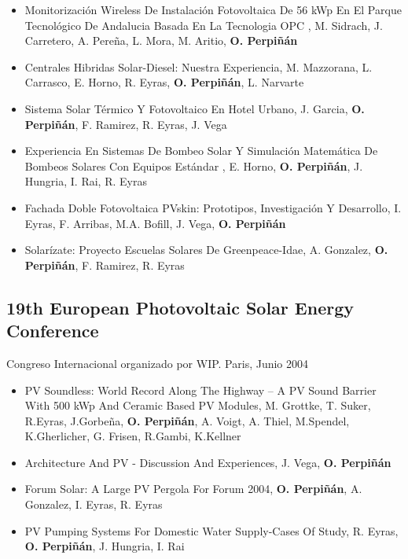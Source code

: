 \documentclass[article, a4paper]{memoir}
\begin{document}
\begin{itemize}
\item Monitorización Wireless De Instalación Fotovoltaica De 56 kWp En El Parque Tecnológico De Andalucia Basada En La Tecnologia OPC , M. Sidrach, J. Carretero, A. Pereña, L. Mora, M. Aritio, \textbf{O. Perpiñán}

\item Centrales Hibridas Solar-Diesel: Nuestra Experiencia, M. Mazzorana, L. Carrasco, E. Horno, R. Eyras, \textbf{O. Perpiñán}, L.  Narvarte

\item Sistema Solar Térmico Y Fotovoltaico En Hotel Urbano, J. Garcia, \textbf{O. Perpiñán}, F. Ramirez, R. Eyras, J. Vega

\item Experiencia En Sistemas De Bombeo Solar Y Simulación Matemática De Bombeos Solares Con Equipos Estándar , E. Horno, \textbf{O. Perpiñán}, J. Hungria, I. Rai, R. Eyras

\item Fachada Doble Fotovoltaica PVskin: Prototipos, Investigación Y Desarrollo, I. Eyras, F. Arribas, M.A. Bofill, J. Vega, \textbf{O. Perpiñán}

\item Solarízate: Proyecto Escuelas Solares De Greenpeace-Idae, A. Gonzalez, \textbf{O. Perpiñán}, F. Ramirez, R. Eyras
\end{itemize}

\subsection{19th European Photovoltaic Solar Energy Conference}
\label{sec:orgheadline63}
Congreso Internacional organizado por WIP. Paris, Junio 2004

\begin{itemize}
\item PV Soundless: World Record Along The Highway -- A PV Sound Barrier With 500 kWp And Ceramic Based PV Modules, M. Grottke, T. Suker, R.Eyras, J.Gorbeña, \textbf{O. Perpiñán}, A. Voigt, A.  Thiel, M.Spendel, K.Gherlicher, G. Frisen, R.Gambi, K.Kellner

\item Architecture And PV - Discussion And Experiences, J. Vega, \textbf{O. Perpiñán}

\item Forum Solar: A Large PV Pergola For Forum 2004, \textbf{O. Perpiñán}, A. Gonzalez, I. Eyras, R. Eyras

\item PV Pumping Systems For Domestic Water Supply-Cases Of Study, R. Eyras, \textbf{O. Perpiñán}, J. Hungria, I. Rai
\end{itemize}
\end{document}
